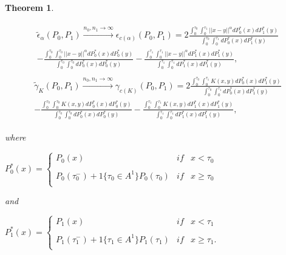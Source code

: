 \documentclass[11pt]{article}
\newtheorem{theorem}{Theorem}
\begin{document}
\begin{appendices}
\begin{theorem}{\label{consistencia}}
	
	\begin{gather}
	\begin{align*}
	\tilde{\epsilon}_\alpha(P_0,P_1) \overset{n_0,n_1\to \infty}{\to} \epsilon_{c(\alpha)}(P_0,P_1)= 2\frac{\int_{0}^{\tau_0} \int_{0}^{\tau_1}	 ||x-y||^{\alpha} dP_0^{*}(x) dP_1^{*}(y)}{\int_{0}^{\tau_0} \int_{0}^{\tau_1} dP_0^{*}(x) dP_1^{*}(y)}\\
	-\frac{\int_{0}^{\tau_0} \int_{0}^{\tau_0}	 ||x-y||^{\alpha} dP_0^{*}(x) dP_0^{*}(y)}{\int_{0}^{\tau_0} \int_{0}^{\tau_0} dP_0^{*}(x) dP_0^{*}(y)} -\frac{\int_{0}^{\tau_1}\int_{0}^{\tau_1}	 ||x-y||^{\alpha} dP_1^{*}(x) dP_1^{*}(y)}{\int_{0}^{\tau_1}\int_{0}^{\tau_1} dP_1^{*}(x) dP_1^{*}(y)},
	\end{align*} 
		\end{gather}
		\begin{gather}
	\begin{align*}
	\tilde{\gamma}_K(P_0,P_1) \overset{n_0,n_1\to \infty}{\to} \gamma_{c(K)}(P_0,P_1)= 2  \frac{\int_{0}^{\tau_0} \int_{0}^{\tau_1}	 K(x,y) dP_0^{*}(x) dP_1^{*}(y)}{\int_{0}^{\tau_0} \int_{0}^{\tau_1} dP_0^{*}(x) dP_1^{*}(y)}\\
	-\frac{\int_{0}^{\tau_0} \int_{0}^{\tau_0}	 K(x,y) dP_0^{*}(x) dP_0^{*}(y)}{\int_{0}^{\tau_0} \int_{0}^{\tau_0}	  dP_0^{*}(x) dP_0^{*}(y)}-\frac{\int_{0}^{\tau_1}\int_{0}^{\tau_1}	K(x,y) dP_1^{*}(x) dP_1^{*}(y)}{\int_{0}^{\tau_1}\int_{0}^{\tau_1} dP_1^{*}(x) dP_1^{*}(y)},
	\end{align*} 
			\end{gather}
	
	
	
	
	
	
	where
	
	$P_0^{*}(x)= \left\{ \begin{array}{lcc}
	P_0(x) &   if  & x < \tau_{0} \\
	\\ P_0(\tau_0^{-})+1\{\tau_0\in A^{1}\}P_0(\tau_0) &  if & x \geq \tau_0 \\
	\end{array}
	\right.$
	
	and
	
	$P_1^{*}(x)= \left\{ \begin{array}{lcc}
	P_1(x) &   if  & x < \tau_{1} \\
	\\ P_1(\tau_1^{-})+1\{\tau_1\in A^{1}\}P_1(\tau_1) &  if & x \geq \tau_1. \\
	
	\end{array}
	\right.$
	

\end{theorem}
\end{appendices}
\end{document}
